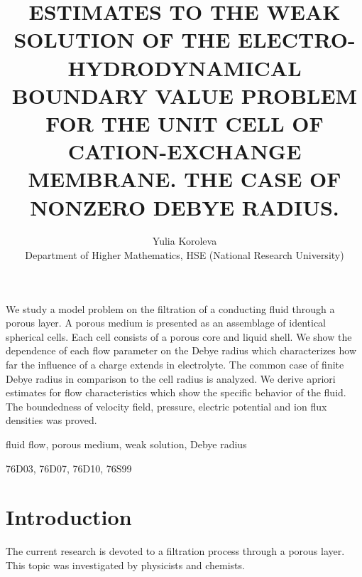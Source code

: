 \documentclass{amsart}
\begin{document}
\newtheorem{theorem}{Theorem}[section]
\newtheorem{dfn}{Definition}[section]
\newtheorem{lemma}{Lemma}[section]
\newtheorem{remark}{Remark}[section]




\title{ESTIMATES TO THE WEAK SOLUTION OF THE ELECTRO-HYDRODYNAMICAL BOUNDARY VALUE PROBLEM FOR THE UNIT CELL OF CATION-EXCHANGE MEMBRANE. THE CASE OF NONZERO DEBYE RADIUS.}

\author{Yulia Koroleva
\\ Department of Higher Mathematics,  HSE (National Research University) }



\abstract
  We study a model problem on the filtration of a conducting fluid through a porous layer. A porous medium is presented as an
assemblage of identical spherical cells. Each cell consists of a porous core and liquid shell. We show the dependence of each flow parameter on the Debye radius  which characterizes how far the influence of a charge extends in electrolyte. The common case of finite Debye radius in comparison to the cell radius is analyzed. We derive apriori estimates for flow characteristics which show the specific behavior of the fluid. The boundedness of velocity field, pressure, electric potential and ion flux densities was proved. 

\endabstract


\keywords
   fluid flow, porous medium, weak solution, Debye radius
\endkeywords

\subjclass
76D03, 76D07, 76D10, 76S99
\endsubjclass


\section{Introduction}\label{sec1}
The current research is devoted to a filtration process through a porous layer. This topic was investigated by physicists and chemists. 
\end{document}
